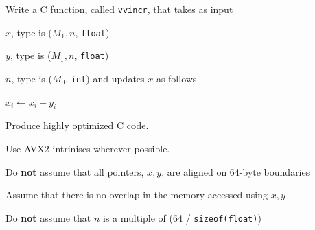 \documentclass[letterpaper,12pt]{article}
\begin{document}



Write a C function, called {\tt vvincr}, that takes as input
\be
\item \(x\), type is (\(M_1, n\), {\tt float})
\item \(y\), type is (\(M_1, n\), {\tt float})
\item \(n\), type is (\(M_0\), {\tt int})
\ee
and updates \(x\) as follows
\be
\item \(x_i \leftarrow x_i + y_i\)
\ee

  \be
\item Produce highly optimized C code.
\item Use AVX2 intriniscs wherever possible.
\item Do {\bf not} assume that all pointers, \(x, y\), are aligned on 64-byte boundaries
\item Assume that there is no overlap in the memory accessed using \(x, y\)
\item Do {\bf not} assume that \(n\) is a multiple of 
  (64 / {\tt sizeof(float)})
  \ee
\end{document}
